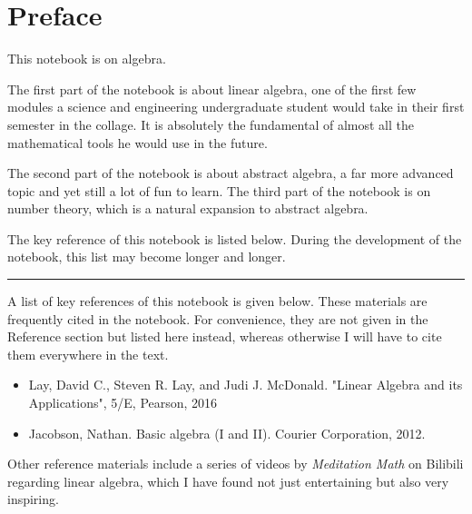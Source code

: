 \chapter*{Preface}

This notebook is on algebra. 

The first part of the notebook is about linear algebra, one of the first few modules a science and engineering undergraduate student would take in their first semester in the collage. It is absolutely the fundamental of almost all the mathematical tools he would use in the future. 

The second part of the notebook is about abstract algebra, a far more advanced topic and yet still a lot of fun to learn. The third part of the notebook is on number theory, which is a natural expansion to abstract algebra.

The key reference of this notebook is listed below. During the development of the notebook, this list may become longer and longer.

\vspace{0.1in}
\noindent \rule{1in}{0.4pt}
\vspace{0.1in}

A list of key references of this notebook is given below. These materials are frequently cited in the notebook. For convenience, they are not given in the Reference section but listed here instead, whereas otherwise I will have to cite them everywhere in the text.

\begin{itemize}
	\item Lay, David C., Steven R. Lay, and Judi J. McDonald. "Linear Algebra and its Applications", 5/E, Pearson, 2016
	\item Jacobson, Nathan. Basic algebra (I and II). Courier Corporation, 2012.
\end{itemize}

Other reference materials include a series of videos by \textit{Meditation Math} on Bilibili regarding linear algebra, which I have found not just entertaining but also very inspiring.